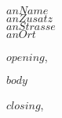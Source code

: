 \documentclass[DIN,
    fontsize=11pt,          %
    paper=a4,               %
    firsthead=on,           %
    firstfoot=on,           %
    pagenumber=off,         %
    parskip=half,           %
    enlargefirstpage=on,    %
    fromalign=locationright, %
    addrfield=on,           %
    subject=titled,         %
    foldmarks=on,          %
    numericaldate=off,      %
    KOMAold]{scrlttr2}
\begin{document}
%
\begin{letter}{$anName$\\
$anZusatz$\\
$anStrasse$\\
$anOrt$
}
%
\opening{$opening$,}
%
$body$

\closing{$closing$,
}
\end{letter}
\end{document}
